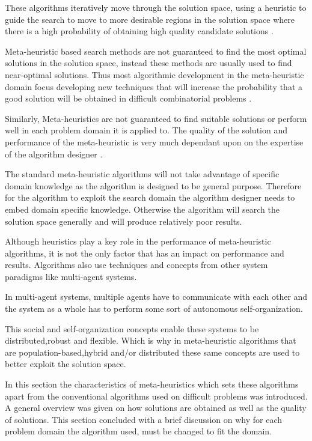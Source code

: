 These algorithms iteratively move through the solution space, using a heuristic to guide the search to move to more desirable regions in the solution space where there is a high probability of obtaining high quality candidate solutions \cite{TabuMontemanniSmith,SweepMeta}.

Meta-heuristic based search methods are not guaranteed to find the most optimal solutions in the solution space, instead these methods are usually used to find near-optimal solutions. Thus most algorithmic development in the meta-heuristic domain focus developing new techniques that will increase the probability that a good solution will be obtained in difficult combinatorial problems \cite{MetaAgricultural}.

Similarly, Meta-heuristics are not guaranteed to find suitable solutions or perform well in each problem domain it is applied to. The quality of the solution and performance of the meta-heuristic is very much dependant upon on the expertise of the algorithm designer \cite{AutoComplexMeta}. 

The standard meta-heuristic algorithms will not take advantage of specific domain knowledge as the algorithm is designed to be general purpose. Therefore for the algorithm to exploit the search domain the algorithm designer needs to embed domain specific knowledge\cite{AutoComplexMeta,AIModernApproach}. Otherwise the algorithm will search the solution space generally and will produce relatively poor results\cite{AutoComplexMeta,AIModernApproach}.

Although heuristics play a key role in the performance of meta-heuristic algorithms, it is not the only factor that has an impact on performance and results. Algorithms also use techniques and concepts from other system paradigms like multi-agent systems\cite{Self-AdaptiveMeta}. 

In multi-agent systems, multiple agents have to communicate with each other and the system as a whole has to perform some sort of autonomous self-organization\cite{Self-AdaptiveMeta}.

This social and self-organization concepts enable these systems to be distributed,robust and flexible. Which is why in meta-heuristic algorithms that are population-based,hybrid and/or distributed these same concepts are used to better exploit the solution space\cite{Self-AdaptiveMeta}.

In this section the characteristics of meta-heuristics which sets these algorithms apart from the conventional algorithms used on difficult problems was introduced. A general overview was given on how solutions are obtained as well as the quality of solutions. This section concluded with a brief discussion on why for each problem domain the algorithm used, must be changed to fit the domain. 

